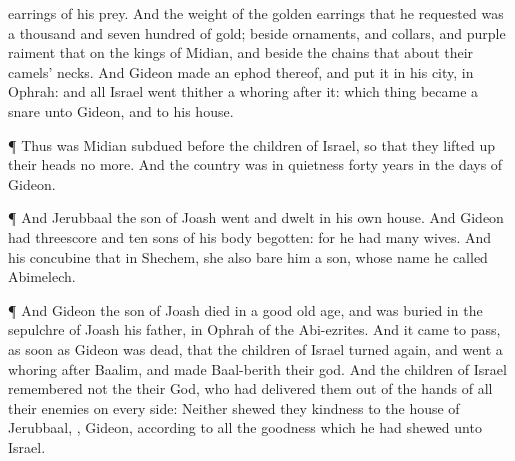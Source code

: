 {earrings of his
prey.
And the
weight of the
golden
earrings that he
requested was a
thousand and
seven
hundred
{} of
gold; beside
ornaments, and
collars, and
purple
raiment that
{} on the
kings of
Midian, and beside the
chains that
{} about their
camels’
necks.
And
Gideon
made an
ephod thereof, and
put it in his
city,
{} in
Ophrah: and all
Israel went thither a
whoring
after it: which thing became a
snare unto
Gideon, and to his
house.
\par }{\PP {}¶ Thus was
Midian
subdued
before the
children of
Israel, so that they lifted
up their
heads no
more. And the
country was in
quietness
forty
years in the
days of
Gideon.
\par }{\PP {}¶ And
Jerubbaal the
son of
Joash
went and
dwelt in his own
house.
And
Gideon had threescore and
ten
sons of his
body
begotten: for he had
many
wives.
And his
concubine that
{} in
Shechem, she also
bare him a
son, whose
name he
called
Abimelech.
\par }{\PP {}¶ And
Gideon the
son of
Joash
died in a
good old
age, and was
buried in the
sepulchre of
Joash his
father, in
Ophrah of the
Abi-ezrites.
And it came to pass, as soon as
Gideon was
dead, that the
children of
Israel turned
again, and went a
whoring
after
Baalim, and
made
Baal-berith their
god.
And the
children of
Israel
remembered not the
{} their
God, who had
delivered them out of the
hands of all their
enemies on every
side:
Neither
shewed they
kindness to the
house of
Jerubbaal,
{},
Gideon, according to all the
goodness which he had
shewed unto
Israel.

}
